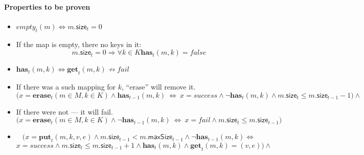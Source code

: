 \documentclass{article}
\renewcommand{\o}[1]{\ensuremath{\mathbf{#1}}}
\newcommand{\p}[1]{\ensuremath{\mathit{#1}}}
\newcommand{\s}[1]{\ensuremath{\mathsf{#1}}}
\begin{document}
\paragraph{Properties to be proven}
\begin{itemize}
  \item $\p{empty}_t(m) \Leftrightarrow m.\s{size}_t=0$
  \item If the map is empty, there no keys in it:
    $$m.\s{size}_t=0 \Rightarrow \forall k\in K \o{has}_t(m, k) = false $$
  \item $\o{has}_t(m, k) \Leftrightarrow \o{get}_t(m, k) \not\rightarrow fail$

      \item If there was a such mapping for $k$, ``erase'' will remove it.
        $$\Big(x=\o{erase}_t(m\in M, k\in K) \wedge \o{has}_{t-1}(m, k) ~\Leftrightarrow~ x=success \wedge \neg\o{has}_t(m, k) \wedge m.\s{size}_t \le m.\s{size}_{t-1}-1 \Big) \wedge$$
      \item If there were not --- it will fail. 
        $$\Big(x=\o{erase}_t(m\in M, k\in K) \wedge \neg\o{has}_{t-1}(m, k) ~\Leftrightarrow~ x=fail\wedge m.\s{size}_t \le m.\s{size}_{t-1}\Big)$$

      \item 
          $$\Big(x=\o{put}_t(m, k, v, e) \wedge m.\s{size}_{t-1} < m.\s{maxSize}_{t-1} \wedge \neg\o{has}_{t-1}(m, k) \Leftrightarrow $$
          $$ x=success \wedge m.\s{size}_t \le m.\s{size}_{t-1}+1 \wedge \o{has}_t(m, k)\wedge\o{get}_t(m, k) = (v, e)\Big)\wedge$$


\end{itemize}
\end{document}
